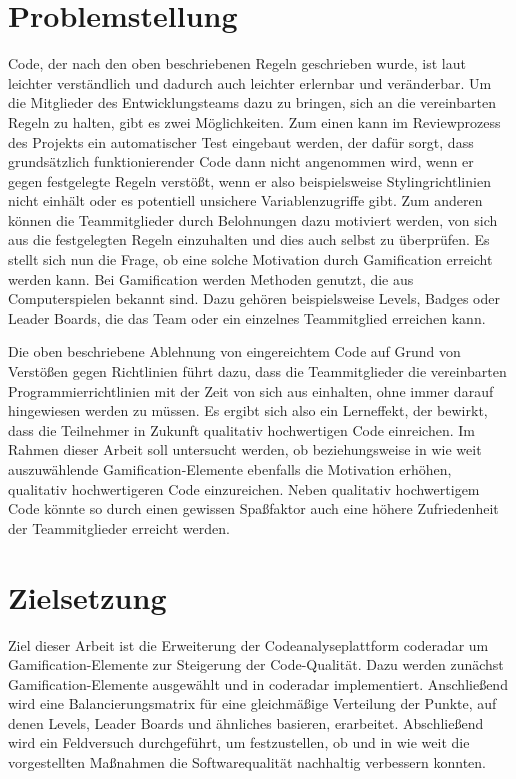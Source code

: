 \documentclass[fontsize=11pt, paper=a4, parskip=half]{scrartcl}
\begin{document}
\section{Problemstellung}
Code, der nach den oben beschriebenen Regeln geschrieben wurde, ist laut \cite{PJ2015} leichter verständlich und dadurch auch leichter erlernbar und veränderbar.
Um die Mitglieder des Entwicklungsteams dazu zu bringen, sich an die vereinbarten Regeln zu halten, gibt es zwei Möglichkeiten.
Zum einen kann im Reviewprozess des Projekts ein automatischer Test eingebaut werden, der dafür sorgt, dass grundsätzlich funktionierender Code dann nicht angenommen wird, wenn er gegen festgelegte Regeln verstößt, wenn er also beispielsweise Stylingrichtlinien nicht einhält oder es potentiell unsichere Variablenzugriffe gibt.
Zum anderen können die Teammitglieder durch Belohnungen dazu motiviert werden, von sich aus die festgelegten Regeln einzuhalten und dies auch selbst zu überprüfen. 
Es stellt sich nun die Frage, ob eine solche Motivation durch Gamification erreicht werden kann.
Bei Gamification werden Methoden genutzt, die aus Computerspielen bekannt sind.
Dazu gehören beispielsweise Levels, Badges oder Leader Boards, die das Team oder ein einzelnes Teammitglied erreichen kann. 

Die oben beschriebene Ablehnung von eingereichtem Code auf Grund von Verstößen gegen Richtlinien führt dazu, dass die Teammitglieder die vereinbarten Programmierrichtlinien mit der Zeit von sich aus einhalten, ohne immer darauf hingewiesen werden zu müssen.
Es ergibt sich also ein Lerneffekt, der bewirkt, dass die Teilnehmer in Zukunft qualitativ hochwertigen Code einreichen.
Im Rahmen dieser Arbeit soll untersucht werden, ob beziehungsweise in wie weit auszuwählende Gamification-Elemente ebenfalls die Motivation erhöhen, qualitativ hochwertigeren Code einzureichen.
Neben qualitativ hochwertigem Code könnte so durch einen gewissen \glqq Spaßfaktor\grqq{} auch eine höhere Zufriedenheit der Teammitglieder erreicht werden.

\section{Zielsetzung}
Ziel dieser Arbeit ist die Erweiterung der Codeanalyseplattform coderadar um Gamification-Elemente zur Steigerung der Code-Qualität.
Dazu werden zunächst Gamification-Elemente ausgewählt und in coderadar implementiert.
Anschließend wird eine Balancierungsmatrix für eine gleichmäßige Verteilung der Punkte, auf denen Levels, Leader Boards und ähnliches basieren, erarbeitet.
Abschließend wird ein Feldversuch durchgeführt, um festzustellen, ob und in wie weit die vorgestellten Maßnahmen die Softwarequalität nachhaltig verbessern konnten.
\end{document}
